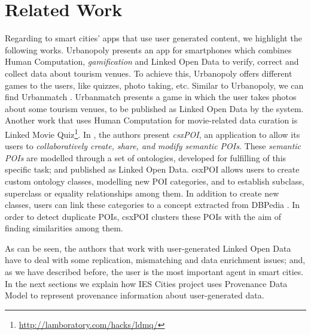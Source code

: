 \section{Related Work}
\label{sec:state_of_the_art}

Regarding to smart cities' apps that use user generated content, we highlight the following works. Urbanopoly \cite{celino_urbanopolysocial_2012} presents an app for smartphones which combines Human Computation, \textit{gamification} and Linked Open Data to verify, correct and collect data about tourism venues. To achieve this, Urbanopoly offers different games to the users, like quizzes, photo taking, etc. Similar to Urbanopoly, we can find Urbanmatch \cite{celino_urbanmatch-linking_2012}. Urbanmatch presents a game in which the user takes photos about some tourism venues, to be published as Linked Open Data by the system. Another work that uses Human Computation for movie-related data curation is Linked Movie Quiz\footnote{\url{http://lamboratory.com/hacks/ldmq/}}. In \cite{braun_collaborative_2007}, the authors present \textit{csxPOI}, an application to allow its users to \textit{collaboratively create, share, and modify semantic POIs}. These \textit{semantic POIs} are modelled through a set of ontologies, developed for fulfilling of this specific task; and published as Linked Open Data. csxPOI allows users to create custom ontology classes, modelling new POI categories, and to establish subclass, superclass or equality relationships among them. In addition to create new classes, users can link these categories to a concept extracted from DBPedia \cite{auer_dbpedia:_2007}. In order to detect duplicate POIs, csxPOI clusters these POIs with the aim of finding similarities among them.

As can be seen, the authors that work with user-generated Linked Open Data have to deal with some replication, mismatching and data enrichment issues; and, as we have described before, the user is the most important agent in smart cities. In the next sections we explain how IES Cities project uses Provenance Data Model to represent provenance information about user-generated data.
